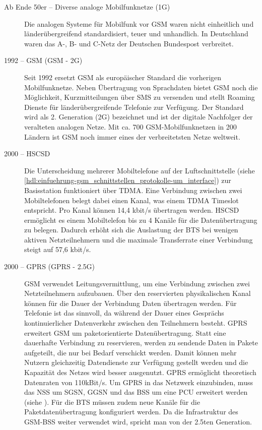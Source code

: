 \begin{description}
\item[Ab Ende 50er -- Diverse analoge Mobilfunknetze (1G)]
Die analogen Systeme für Mobilfunk vor \ac{GSM} waren nicht einheitlich und länderübergreifend standardisiert, teuer und unhandlich. In Deutschland waren das A-, B- und C-Netz der Deutschen Bundespost verbreitet.
\item[1992 -- \acl{GSM} (\acs{GSM} - 2G)]
Seit 1992 ersetzt \ac{GSM} als europäischer Standard die vorherigen Mobilfunknetze. Neben Übertragung von Sprachdaten bietet \ac{GSM} noch die Möglichkeit, Kurzmitteilungen über \ac{SMS} zu versenden und stellt Roaming Dienste für länderübergreifende Telefonie zur Verfügung. Der Standard wird als 2. Generation (2G) bezeichnet und ist der digitale Nachfolger der veralteten analogen Netze. Mit ca. 700 \ac{GSM}-Mobilfunknetzen in 200 Ländern ist \ac{GSM} noch immer eines der verbreitetsten Netze weltweit.
\item[2000 -- \ac{HSCSD}]
Die Unterscheidung mehrerer Mobiltelefone auf der Luftschnittstelle (siehe \autoref{hdl:einfuehrung-gsm_schnittstellen_protokolle-um_interface}) zur Basisstation funktioniert über \ac{TDMA}. Eine Verbindung zwischen zwei Mobiltelefonen belegt dabei einen Kanal, was einem \ac{TDMA} Timeslot entspricht. Pro Kanal können 14,4 kbit/s übertragen werden. \ac{HSCSD} ermöglicht es einem Mobiltelefon bis zu 4 Kanäle für die Datenübertragung zu belegen. Dadurch erhöht sich die Auslastung der \ac{BTS} bei wenigen aktiven Netzteilnehmern und die maximale Transferrate einer Verbindung steigt auf 57,6 kbit/s.
\item[2000 -- \acl{GPRS} (\acs{GPRS} - 2.5G)]
\ac{GSM} verwendet Leitungsvermittlung, um eine Verbindung zwischen zwei Netzteilnehmern aufzubauen. Über den reservierten physikalischen Kanal können für die Dauer der Verbindung Daten übertragen werden. Für Telefonie ist das sinnvoll, da während der Dauer eines Gesprächs kontinuierlicher Datenverkehr zwischen den Teilnehmern besteht. \ac{GPRS} erweitert \ac{GSM} um paketorientierte Datenübertragung. Statt eine dauerhafte Verbindung zu reservieren, werden zu sendende Daten in Pakete aufgeteilt, die nur bei Bedarf verschickt werden. Damit können mehr Nutzern gleichzeitig Datendienste zur Verfügung gestellt werden und die Kapazität des Netzes wird besser ausgenutzt.
\ac{GPRS} ermöglicht theoretisch Datenraten von 110kBit/s. Um \ac{GPRS} in das Netzwerk einzubinden, muss das \ac{NSS} um \ac{SGSN}, \ac{GGSN} und das \ac{BSS} um eine \ac{PCU} erweitert werden (siehe ). Für die \ac{BTS} müssen zudem neue Kanäle für die Paketdatenübertragung konfiguriert werden. Da die Infrastruktur des \ac{GSM}-\ac{BSS} weiter verwendet wird, spricht man von der 2.5ten Generation.

\end{description}
